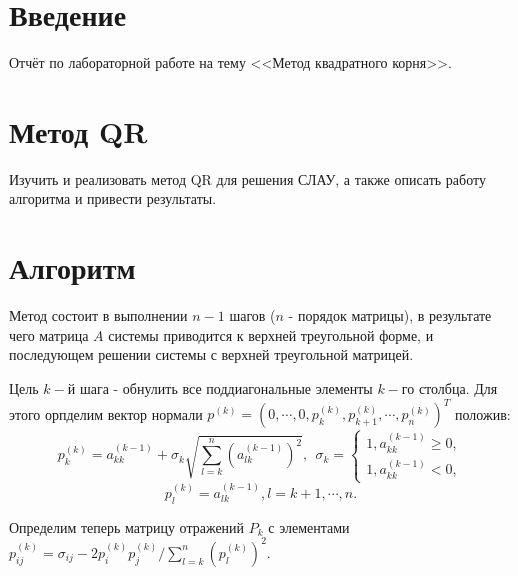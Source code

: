 \documentclass[14pt, titlepage,fleqn]{extarticle}
\begin{document}
	

	
	
	\newpage
	
	\tableofcontents   
	\clearpage
	\section*{Введение}
	Отчёт по лабораторной работе на тему <<Метод квадратного корня>>.	
	\newpage









	\section*{Метод QR}
	Изучить и реализовать метод QR для решения СЛАУ, а также описать работу алгоритма и
	привести результаты.

	\section*{Алгоритм}
	Метод состоит в выполнении $n-1$ шагов ($n$ - порядок матрицы), в результате чего матрица $A$ системы приводится к верхней треугольной форме, и последующем решении системы с верхней треугольной матрицей.
	
	Цель $k-$й шага - обнулить все поддиагональные элементы $k-$го столбца. Для этого орпделим вектор нормали $p^{(k)} = (0, \cdots, 0, p^{(k)}_{k}, p^{(k)}_{k+1}, \cdots, p^{(k)}_{n})^T$ положив:
	\[p^{(k)}_{k} = a^{(k-1)}_{kk} + \sigma_k \sqrt{\sum^{n}_{l=k}(a^{(k-1)}_{lk})^2}, ~~ \sigma_k = \begin{cases}
		1, a^{(k-1)}_{kk} \geq 0,\\
		1, a^{(k-1)}_{kk} < 0 ,
	\end{cases}\]
	\[p^{(k)}_{l} = a^{(k-1)}_{lk}, l = k + 1, \cdots, n.\]
	
	Определим теперь матрицу отражений $P_k$ с элементами $p^{(k)}_{ij} =\sigma_{ij}- 2p^{(k)}_{i}p^{(k)}_{j}/ \sum^{n}_{l=k}(p^{(k)}_{l})^2.$
\end{document}
